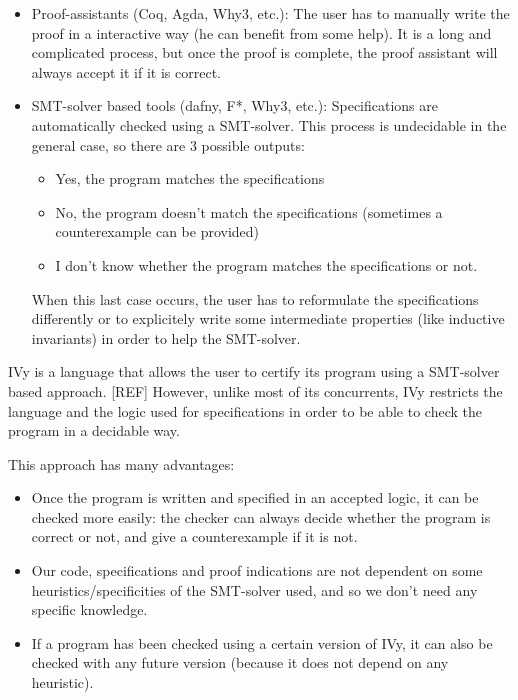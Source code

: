 \documentclass[11pt,a4paper,oldfontcommands]{memoir}
\begin{document}
    \begin{itemize}
        \item Proof-assistants (Coq, Agda, Why3, etc.):
        The user has to manually write the proof in a interactive way (he can benefit from some help).
        It is a long and complicated process, but once the proof is complete, the proof assistant will always accept it
        if it is correct.
        \item SMT-solver based tools (dafny, F*, Why3, etc.):
        Specifications are automatically checked using a SMT-solver. This process is undecidable in the general case,
        so there are 3 possible outputs:
        \begin{itemize}
            \item Yes, the program matches the specifications
            \item No, the program doesn't match the specifications (sometimes a counterexample can be provided)
            \item I don't know whether the program matches the specifications or not.
        \end{itemize}
        When this last case occurs, the user has to reformulate the specifications differently or to explicitely write some intermediate properties (like inductive invariants)
        in order to help the SMT-solver.
    \end{itemize}

    IVy is a language that allows the user to certify its program using a SMT-solver based approach. [REF]
    However, unlike most of its concurrents, IVy restricts the language and the logic used for specifications
    in order to be able to check the program in a decidable way.

    This approach has many advantages:
    \begin{itemize}
        \item Once the program is written and specified in an accepted logic, it can be checked more easily:
        the checker can always decide whether the program is correct or not, and give a counterexample if it is not.
        \item Our code, specifications and proof indications are not dependent on some heuristics/specificities of the SMT-solver used,
        and so we don't need any specific knowledge.
        \item If a program has been checked using a certain version of IVy, it can also be checked with
        any future version (because it does not depend on any heuristic).
    \end{itemize}
    
\end{document}
